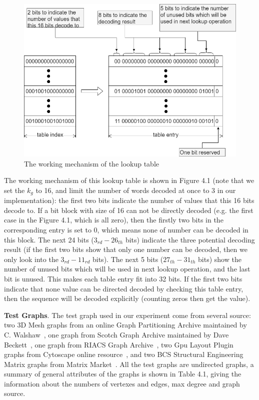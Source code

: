 \documentclass[12pt,glossary]{dalthesis}
\begin{document}
\begin{figure}[ht]
\centering
\includegraphics[width=1.0\textwidth]{Decoding}
\caption{The working mechanism of the lookup table}
\end{figure}

\bigskip

The working mechanism of this lookup table is shown in Figure 4.1 (note that we set the $k_{g}$ to 16, and limit the number of words decoded at once to 3 in our implementation): the first two bits indicate the number of values that this 16 bits decode to. If a bit block with size of 16 can not be directly decoded (e.g. the first case in the Figure 4.1, which is all zero), then the firstly two bits in the corresponding entry is set to 0, which means none of number can be decoded in this block. The next 24 bits ($3_{rd} - 26_{th}$ bits) indicate the three potential decoding result (if the first two bits show that only one number can be decoded, then we only look into the $3_{rd} - 11_{rd}$ bits). The next 5 bits ($27_{th} - 31_{th}$ bits) show the number of unused bits which will be used in next lookup operation, and the last bit is unused. This makes each table entry fit into 32 bits. If the first two bits indicate that none value can be directed decoded by checking this table entry, then the sequence will be decoded explicitly (counting zeros then get the value).

\textbf{Test Graphs}. The test graph used in our experiment come from several source: two 3D Mesh graphs from an online Graph Partitioning Archive maintained by C. Walshaw~\cite{3DMESH}, one graph from Scotch Graph Archive maintained by Dave Beckett~\cite{Scotch}, one graph from RIACS Graph Archive~\cite{RIACS}, two Gpu Layout Plugin graphs from Cytoscape online resource~\cite{Cytoscape}, and two BCS Structural Engineering Matrix graphs from Matrix Market~\cite{Matrix}. All the test graphs are undirected graphs, a summary of general attributes of the graphs is shown in Table 4.1, giving the information about the numbers of vertexes and edges, max degree and graph source.
\end{document}
